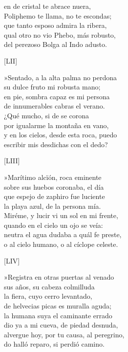 \documentclass[11pt,a4paper,twoside]{article}
\begin{document}
en  de cristal te abrace nuera,\\
Poliphemo te llama, no te escondas;\\
que tanto esposo admira la ribera,\\
qual otro no vio Phebo, más robusto,\\
del perezoso Bolga al Indo adusto.\par\pend
\relax
\vfill
\newpage
%
\begin{center}
	[LII]
\end{center}\pstart
»Sentado, a la alta palma no perdona\\
su dulce fruto mi robusta mano;\\
en pie, sombra capaz es mi persona\\
de innumerables cabras el verano.\\
¿Qué mucho, si de  se corona\\
por igualarme la montaña en vano,\\
y en los cielos, desde esta roca, puedo\\
escribir mis desdichas con el dedo?\par\pend
%
\begin{center}
	[LIII]
\end{center}\pstart
»Marítimo alcïón, roca eminente\\
sobre sus huebos coronaba, el día\\
que espejo de zaphiro fue luciente\\
la playa azul, de la persona mía.\\
Miréme, y lucir vi un sol en mi frente,\\
quando en el cielo un ojo se veía:\\
neutra el agua dudaba a quál fe preste,\\
o al cielo humano, o al cíclope celeste.\par\pend
%
\begin{center}
	[LIV]
\end{center}\pstart
»Registra en otras puertas al venado\\
sus años, su cabeza colmilluda\\
la fiera, cuyo cerro levantado,\\
de helvecias picas es muralla aguda;\\
la humana suya el caminante errado\\
dio ya a mi cueva, de piedad desnuda,\\
alvergue hoy, por tu causa, al peregrino,\\
do halló reparo, si perdió camino.\par\pend
\end{document}
